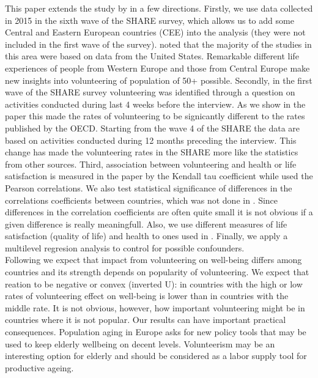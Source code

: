 \documentclass[10pt, letterpaper]{article}
\begin{document}
\begin{spacing}{1.4}
This paper extends the study by \citet{haski09} in a few directions. Firstly, we
use data collected in 2015 in the sixth wave of the SHARE survey, which allows
us to add some Central and Eastern European countries (CEE) into the analysis
(they were not included in the first wave of the survey).  \citep{casiday08}
noted that the majority of the studies in this area were based on data from the
United States. Remarkable different life experiences of people from Western
Europe and those from Central Europe make new insights into volunteering of
population of 50+ possible.  Secondly, in the first wave of the SHARE survey
volunteering was identified through a question on activities conducted during
last 4 weeks before the interview. As we show in the paper this made the rates
of volunteering to be signicantly different to the rates published by the
OECD. Starting from the wave 4 of the SHARE the data are based on activities
conducted during 12 months preceding the interview. This change has made the
volunteering rates in the SHARE more like the statistics from other sources.
Third, association between volunteering and health or life satisfaction is
measured in the paper by the Kendall tau coefficient while \citet{haski09} used
the Pearson correlations. We also test statistical significance of differences
in the correlations coefficients between countries,  which was not done in \citet{haski09}.  Since differences in the correlation coefficients are often quite small it is not obvious if a given difference is really meaningfull. Also, we use different measures of life satisfaction (quality of life) and health to ones used in \citet{haski09}. Finally, we apply a multilevel regresion analysis to control for possible confounders.  \\

Following \citet{haski09} we expect that impact from volunteering on well-being
differs among countries and its strength depends on popularity of
volunteering. We expect that reation to be negative or convex (inverted U):  in
countries with the high or low rates of volunteering effect on well-being is lower than in countries with the middle rate. It is not obvious, however, how important  volunteering might be in countries where it is not popular. Our results can have important practical consequences. Population aging in Europe asks for new policy tools that may be used to keep elderly wellbeing on decent levels. Volunteerism may be an interesting option for elderly and should be considered as a labor supply tool for productive ageing. 
 



\end{spacing}
\end{document}
